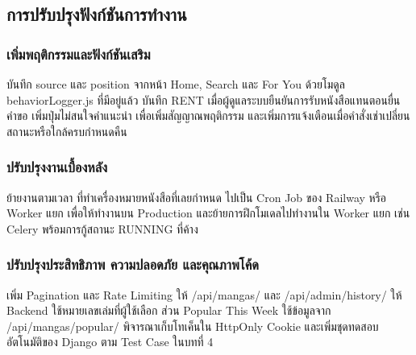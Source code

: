 \subsection{การปรับปรุงฟังก์ชันการทำงาน}

\subsubsection{เพิ่มพฤติกรรมและฟังก์ชันเสริม}
บันทึก source และ position จากหน้า Home, Search และ For You ด้วยโมดูล behaviorLogger.js ที่มีอยู่แล้ว บันทึก RENT เมื่อผู้ดูแลระบบยืนยันการรับหนังสือแทนตอนยื่นคำขอ เพิ่มปุ่มไม่สนใจคำแนะนำ เพื่อเพิ่มสัญญาณพฤติกรรม และเพิ่มการแจ้งเตือนเมื่อคำสั่งเช่าเปลี่ยนสถานะหรือใกล้ครบกำหนดคืน

\subsubsection{ปรับปรุงงานเบื้องหลัง}
ย้ายงานตามเวลา ที่ทำเครื่องหมายหนังสือที่เลยกำหนด ไปเป็น Cron Job ของ Railway หรือ Worker แยก เพื่อให้ทำงานบน Production และย้ายการฝึกโมเดลไปทำงานใน Worker แยก เช่น Celery พร้อมการกู้สถานะ RUNNING ที่ค้าง

\subsubsection{ปรับปรุงประสิทธิภาพ ความปลอดภัย และคุณภาพโค้ด}
เพิ่ม Pagination และ Rate Limiting ให้ /api/mangas/ และ /api/admin/history/ ให้ Backend ใช้หมายเลขเล่มที่ผู้ใช้เลือก ส่วน Popular This Week ใช้ข้อมูลจาก /api/mangas/popular/ พิจารณาเก็บโทเค็นใน HttpOnly Cookie และเพิ่มชุดทดสอบอัตโนมัติของ Django ตาม Test Case ในบทที่ 4
